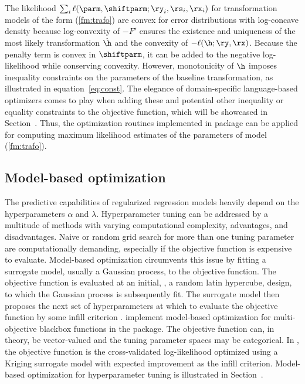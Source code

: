 The likelihood $\sum_i \ell(\parm, \shiftparm; \ry_i, \rs_i, \rx_i)$ for
transformation models of the form (\ref{fm:trafo}) are convex for error
distributions with log-concave density because log-convexity
of $-{F'}$ ensures the existence and uniqueness of the most likely transformation
$\hat\h$ and the convexity of $-\ell(\h; \ry, \rx)$.
Because the penalty term is convex in $\shiftparm$, it can be added to the 
negative log-likelihood while conserving convexity.
However, monotonicity of $\h$ imposes inequality constraints on the parameters
of the baseline transformation, as illustrated in equation~\eqref{eq:const}.
The elegance of domain-specific language-based optimizers comes to play when adding
these and potential other inequality or equality constraints to the objective
function, which will be showcased in Section~.
Thus, the optimization routines implemented in package  can be
applied for computing maximum likelihood estimates of the parameters of
model (\ref{fm:trafo}).

\subsection{Model-based optimization} \label{subsec:mbo}

The predictive capabilities of regularized regression models heavily depend on
the hyperparameters $\alpha$ and $\lambda$. Hyperparameter tuning
can be addressed by a multitude of methods with varying computational complexity,
advantages, and disadvantages. Naive or random grid search for more than one
tuning parameter are computationally demanding, especially if the objective function
is expensive to evaluate. Model-based optimization circumvents this issue by
fitting a surrogate model, usually a Gaussian process, to the objective function.
The objective function is evaluated at an initial, \eg, a random latin hypercube,
design, to which the Gaussian process is subsequently fit. The surrogate model
then proposes the next set of hyperparameters at which to evaluate the objective 
function by some  infill criterion \citep{mbopaper}.
\citet{mlrMBO} implement model-based optimization
for multi-objective blackbox functions in the  package. The objective
function can, in theory, be vector-valued and the tuning parameter spaces may be
categorical. In , the objective function is the cross-validated
log-likelihood optimized using a Kriging surrogate model with expected
improvement as the infill criterion. Model-based optimization for hyperparameter
tuning is illustrated in Section~.

